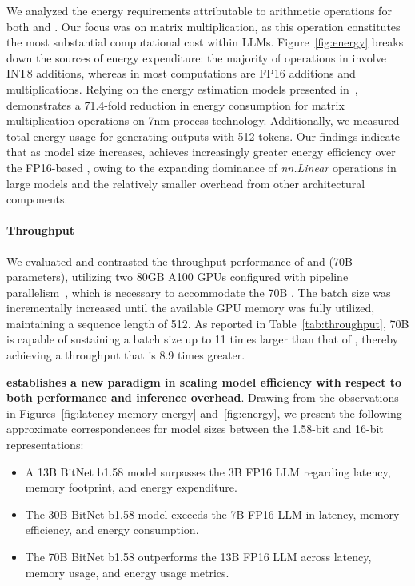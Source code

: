We analyzed the energy requirements attributable to arithmetic operations for both  and . Our focus was on matrix multiplication, as this operation constitutes the most substantial computational cost within LLMs. Figure~\ref{fig:energy} breaks down the sources of energy expenditure: the majority of operations in  involve INT8 additions, whereas in  most computations are FP16 additions and multiplications. Relying on the energy estimation models presented in~\cite{energycost, pokebnn},  demonstrates a 71.4-fold reduction in energy consumption for matrix multiplication operations on 7nm process technology. Additionally, we measured total energy usage for generating outputs with 512 tokens. Our findings indicate that as model size increases,  achieves increasingly greater energy efficiency over the FP16-based , owing to the expanding dominance of \emph{nn.Linear} operations in large models and the relatively smaller overhead from other architectural components.

\paragraph{Throughput}

We evaluated and contrasted the throughput performance of  and  (70B parameters), utilizing two 80GB A100 GPUs configured with pipeline parallelism~\cite{gpipe}, which is necessary to accommodate the 70B . The batch size was incrementally increased until the available GPU memory was fully utilized, maintaining a sequence length of 512. As reported in Table~\ref{tab:throughput},  70B is capable of sustaining a batch size up to 11 times larger than that of , thereby achieving a throughput that is 8.9 times greater.

\textbf{ establishes a new paradigm in scaling model efficiency with respect to both performance and inference overhead}. Drawing from the observations in Figures~\ref{fig:latency-memory-energy} and~\ref{fig:energy}, we present the following approximate correspondences for model sizes between the 1.58-bit and 16-bit representations:

\begin{itemize}
    \item A 13B BitNet b1.58 model surpasses the 3B FP16 LLM regarding latency, memory footprint, and energy expenditure.
    \item The 30B BitNet b1.58 model exceeds the 7B FP16 LLM in latency, memory efficiency, and energy consumption.
    \item The 70B BitNet b1.58 outperforms the 13B FP16 LLM across latency, memory usage, and energy usage metrics.
\end{itemize}

